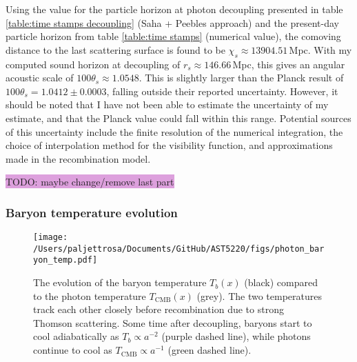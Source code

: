 \documentclass{aa}
\numberwithin{equation}{section}
\numberwithin{table}{section}
\numberwithin{figure}{section}
\begin{document}
Using the value for the particle horizon at photon decoupling presented in table \ref{table:time stamps decoupling} (Saha + Peebles approach) and the present-day particle horizon from table \ref{table:time stamps} (numerical value), the comoving distance to the last scattering surface is found to be $\chi_{s} \approx 13904.51\,$Mpc. With my computed sound horizon at decoupling of $r_s \approx 146.66\,$Mpc, this gives an angular acoustic scale of $100\theta_{s} \approx 1.0548$. This is slightly larger than the Planck result of $100\theta_{s} = 1.0412\pm0.0003$, falling outside their reported uncertainty. However, it should be noted that I have not been able to estimate the uncertainty of my estimate, and that the Planck value could fall within this range. Potential sources of this uncertainty include the finite resolution of the numerical integration, the choice of interpolation method for the visibility function, and approximations made in the recombination model.

\colorbox{Plum}{TODO: maybe change/remove last part}



\subsubsection{Baryon temperature evolution}

\begin{figure}
  \centering
  \texttt{[image: /Users/paljettrosa/Documents/GitHub/AST5220/figs/photon\_baryon\_temp.pdf]}
  \caption{The evolution of the baryon temperature $T_b(x)$ (black) compared to the photon temperature $T_\text{CMB}(x)$ (grey). The two temperatures track each other closely before recombination due to strong Thomson scattering. Some time after decoupling, baryons start to cool adiabatically as $T_b \propto a^{-2}$ (purple dashed line), while photons continue to cool as $T_\text{CMB} \propto a^{-1}$ (green dashed line).}\label{fig:baryon temperature}
\end{figure}
\end{document}
